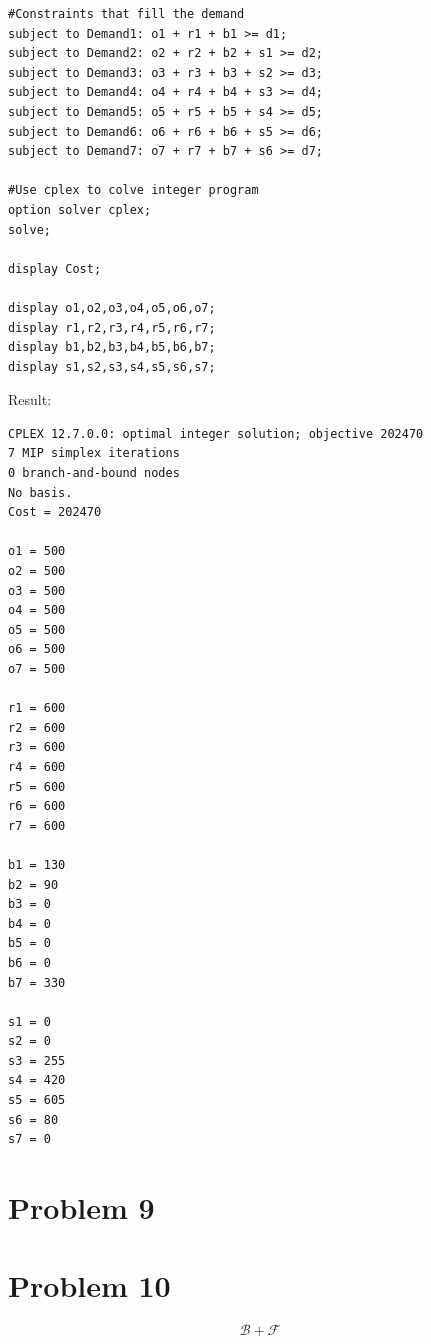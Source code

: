 \documentclass{article}
\begin{document}
{\begin{lstlisting}[language=AMPL]
#Constraints that fill the demand
subject to Demand1: o1 + r1 + b1 >= d1;
subject to Demand2: o2 + r2 + b2 + s1 >= d2;
subject to Demand3: o3 + r3 + b3 + s2 >= d3;
subject to Demand4: o4 + r4 + b4 + s3 >= d4;
subject to Demand5: o5 + r5 + b5 + s4 >= d5;
subject to Demand6: o6 + r6 + b6 + s5 >= d6;
subject to Demand7: o7 + r7 + b7 + s6 >= d7;

#Use cplex to colve integer program
option solver cplex;
solve;

display Cost;

display o1,o2,o3,o4,o5,o6,o7;
display r1,r2,r3,r4,r5,r6,r7;
display b1,b2,b3,b4,b5,b6,b7;
display s1,s2,s3,s4,s5,s6,s7;
    \end{lstlisting}

    Result:
    \begin{lstlisting}[language=AMPL]
CPLEX 12.7.0.0: optimal integer solution; objective 202470
7 MIP simplex iterations
0 branch-and-bound nodes
No basis.
Cost = 202470

o1 = 500
o2 = 500
o3 = 500
o4 = 500
o5 = 500
o6 = 500
o7 = 500

r1 = 600
r2 = 600
r3 = 600
r4 = 600
r5 = 600
r6 = 600
r7 = 600

b1 = 130
b2 = 90
b3 = 0
b4 = 0
b5 = 0
b6 = 0
b7 = 330

s1 = 0
s2 = 0
s3 = 255
s4 = 420
s5 = 605
s6 = 80
s7 = 0
    \end{lstlisting}
}

\section*{Problem 9}{

}

\section*{Problem 10}{
    \[\mathcal{B}+\mathcal{F}\]
}
\end{document}
